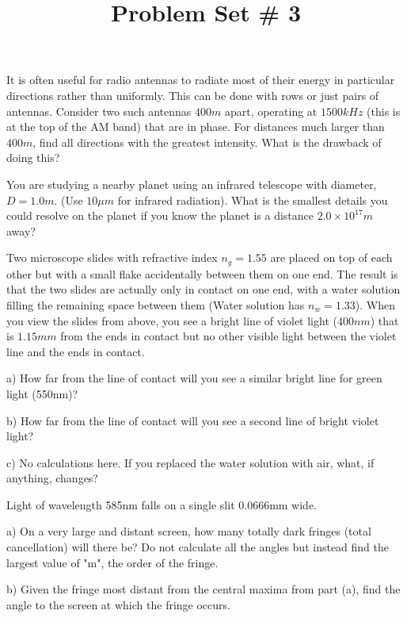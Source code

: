 \documentclass[10pt]{article}
\newenvironment{problem}[2][Problem]{\begin{trivlist}
\item[\hskip \labelsep {\bfseries #1}\hskip \labelsep {\bfseries #2.}]}{\end{trivlist}}
\begin{document}
 \title{Problem Set \# 3}
\date{}
\maketitle

\begin{problem}{1}
It is often useful for radio antennas to radiate most of their energy in particular directions rather than uniformly. This can be done with rows or just pairs of antennas. Consider two such antennas $400m$ apart, operating at $1500kHz$ (this is at the top of the AM band) that are in phase. For distances much larger than $400m$, find all directions with the greatest intensity. What is the drawback of doing this?
\end{problem}
 


\begin{problem}{2}
You are studying a nearby planet using an infrared telescope with diameter, $D=1.0m$. (Use $10\mu m$ for infrared radiation). What is the smallest details you could resolve on the planet if you know the planet is a distance $2.0\times10^{17}m$ away?
\end{problem}

\begin{problem}{3}
Two microscope slides with refractive index $n_g=1.55$ are placed on top of each other but with a small flake accidentally between them on one end. The result is that the two slides are actually only in contact on one end, with a water solution filling the remaining space between them (Water solution has $n_w=1.33$). When you view the slides from above, you see a bright line of violet light ($400nm$) that is $1.15mm$ from the ends in contact but no other visible light between the violet line and the ends in contact.
\item a) How far from the line of contact will you see a similar bright line for green light (550nm)?
\item b) How far from the line of contact will you see a second line of bright violet light?
\item c) No calculations here. If you replaced the water solution with air, what, if anything, changes?
\end{problem}






\begin{problem}{4}
Light of wavelength 585nm falls on a single slit 0.0666mm wide.
\item a) On a very large and distant screen, how many totally dark fringes (total cancellation) will there be? Do not calculate all the angles but instead find the largest value of "m", the order of the fringe.
\item b) Given the fringe most distant from the central maxima from part (a), find the angle to the screen at which the fringe occurs.
\end{problem}
\end{document}
